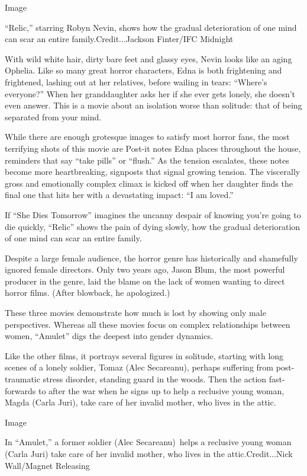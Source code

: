 Image

``Relic,'' starring Robyn Nevin, shows how the gradual deterioration of
one mind can scar an entire family.Credit...Jackson Finter/IFC Midnight

With wild white hair, dirty bare feet and glassy eyes, Nevin looks like
an aging Ophelia. Like so many great horror characters, Edna is both
frightening and frightened, lashing out at her relatives, before wailing
in tears: ``Where's everyone?'' When her granddaughter asks her if she
ever gets lonely, she doesn't even answer. This is a movie about an
isolation worse than solitude: that of being separated from your mind.

While there are enough grotesque images to satisfy most horror fans, the
most terrifying shots of this movie are Post-it notes Edna places
throughout the house, reminders that say ``take pills'' or ``flush.'' As
the tension escalates, these notes become more heartbreaking, signposts
that signal growing tension. The viscerally gross and emotionally
complex climax is kicked off when her daughter finds the final one that
hits her with a devastating impact: ``I am loved.''

If ``She Dies Tomorrow'' imagines the uncanny despair of knowing you're
going to die quickly, ``Relic'' shows the pain of dying slowly, how the
gradual deterioration of one mind can scar an entire family.

Despite a large female audience, the horror genre has historically and
shamefully ignored female directors. Only two years ago, Jason Blum, the
most powerful producer in the genre, laid the blame on the lack of women
wanting to direct horror films. (After blowback, he apologized.)

These three movies demonstrate how much is lost by showing only male
perspectives. Whereas all these movies focus on complex relationships
between women, ``Amulet'' digs the deepest into gender dynamics.

Like the other films, it portrays several figures in solitude, starting
with long scenes of a lonely soldier, Tomaz (Alec Secareanu), perhaps
suffering from post-traumatic stress disorder, standing guard in the
woods. Then the action fast-forwards to after the war when he signs up
to help a reclusive young woman, Magda (Carla Juri), take care of her
invalid mother, who lives in the attic.

Image

In ``Amulet,'' a former soldier (Alec Secareanu)~helps a reclusive young
woman (Carla Juri) take care of her invalid mother, who lives in the
attic.Credit...Nick Wall/Magnet Releasing

